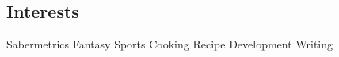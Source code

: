 \documentclass[a4paper, oneside, final]{scrartcl} %
\begin{document}
\begin{center}

\section{Interests}

Sabermetrics {\large\textperiodcentered} Fantasy Sports {\large\textperiodcentered} Cooking {\large\textperiodcentered} Recipe Development {\large\textperiodcentered} Writing


\end{center}
\end{document}
